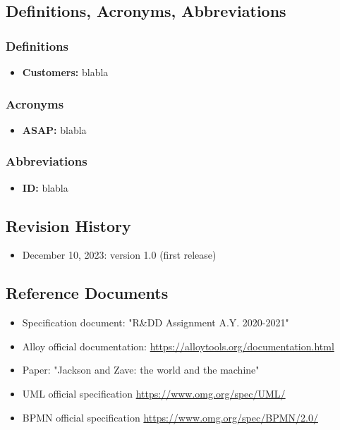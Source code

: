 \subsection{Definitions, Acronyms, Abbreviations}
\subsubsection{Definitions}
\begin{itemize}
    \item \textbf{Customers:} blabla

\end{itemize}
\subsubsection{Acronyms}
\begin{itemize}
    \item {\textbf{ASAP:} blabla}

\end{itemize}
\subsubsection{Abbreviations}
\begin{itemize}
    \item {\textbf{ID:} blabla}
\end{itemize}
\subsection{Revision History}
\begin{itemize}
    \item December 10, 2023: version 1.0 (first release)
\end{itemize}
\subsection{Reference Documents}
\begin{itemize}
    \item {Specification document: "R\&DD Assignment A.Y. 2020-2021"}
    \item {Alloy official documentation: \href{https://alloytools.org/documentation.html}{https://alloytools.org/documentation.html}}
    \item {Paper: "Jackson and Zave: the world and the machine"}
    \item {UML official specification \href{https://www.omg.org/spec/UML/}{https://www.omg.org/spec/UML/}}
    \item {BPMN official specification \href{https://www.omg.org/spec/BPMN/2.0/}{https://www.omg.org/spec/BPMN/2.0/}}
\end{itemize}
